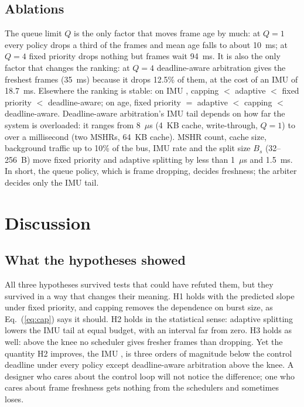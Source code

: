 \documentclass[11pt,a4paper]{article}
\begin{document}
\subsection{Ablations}\label{sec:ablations}
\begin{table}[h]\centering\caption{Ablations at 120 fps, $B_c=1$~KB, synthetic traffic, 5 seeds; one factor changed at a time. IMU \pone{} ($\mu$s) and mean frame age (ms) for fixed priority (FP), capped, adaptive (Ad.) and deadline-aware (DL).}
\end{table}
The queue limit $Q$ is the only factor that moves frame age by much: at $Q=1$ every policy drops a third of the frames and mean age falls to about 10~ms; at $Q=4$ fixed priority drops nothing but frames wait 94~ms. It is also the only factor that changes the ranking: at $Q=4$ deadline-aware arbitration gives the freshest frames (35~ms) because it drops 12.5\% of them, at the cost of an IMU \pone{} of 18.7~ms. Elsewhere the ranking is stable: on IMU \pone{}, capping $<$ adaptive $<$ fixed priority $<$ deadline-aware; on age, fixed priority $=$ adaptive $<$ capping $<$ deadline-aware. Deadline-aware arbitration's IMU tail depends on how far the system is overloaded: it ranges from 8~$\mu$s (4~KB cache, write-through, $Q=1$) to over a millisecond (two MSHRs, 64~KB cache). MSHR count, cache size, background traffic up to 10\% of the bus, IMU rate and the split size $B_s$ (32--256~B) move fixed priority and adaptive splitting by less than 1~$\mu$s and 1.5~ms. In short, the queue policy, which is frame dropping, decides freshness; the arbiter decides only the IMU tail.

\section{Discussion}\label{sec:discussion}
\subsection{What the hypotheses showed}
All three hypotheses survived tests that could have refuted them, but they survived in a way that changes their meaning. H1 holds with the predicted slope under fixed priority, and capping removes the dependence on burst size, as Eq.~(\ref{eq:cap}) says it should. H2 holds in the statistical sense: adaptive splitting lowers the IMU tail at equal budget, with an interval far from zero. H3 holds as well: above the knee no scheduler gives fresher frames than dropping. Yet the quantity H2 improves, the IMU \pone{}, is three orders of magnitude below the control deadline under every policy except deadline-aware arbitration above the knee. A designer who cares about the control loop will not notice the difference; one who cares about frame freshness gets nothing from the schedulers and sometimes loses.
\end{document}

